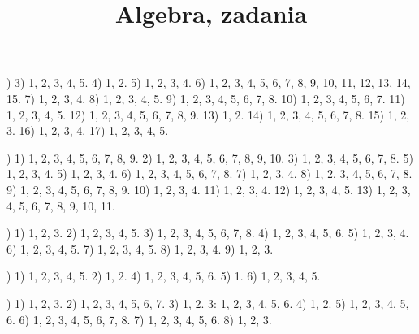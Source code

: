 \documentclass[a4paper,11pt]{article}
\title{Algebra, zadania}
\begin{document}





\maketitle %







\noindent
{}) 3) 1, 2, 3, 4, 5. 4) 1, 2. 5) 1, 2, 3, 4. 6) 1, 2, 3, 4,
5, 6, 7, 8, 9, 10, 11, 12, 13, 14, 15. 7) 1, 2, 3, 4.
8) 1, 2, 3, 4, 5. 9) 1, 2, 3, 4, 5, 6, 7, 8. 10) 1, 2, 3, 4, 5, 6, 7.
11) 1, 2, 3, 4, 5. 12) 1, 2, 3, 4, 5, 6, 7, 8, 9. 13) 1, 2. 14) 1, 2, 3,
4, 5, 6, 7, 8. 15) 1, 2, 3. 16) 1, 2, 3, 4. 17) 1, 2, 3, 4, 5.

\vspace{\spaceFour}



\noindent
{}) 1) 1, 2, 3, 4, 5, 6, 7, 8, 9. 2) 1, 2, 3, 4, 5, 6, 7,
8, 9, 10. 3) 1, 2, 3, 4, 5, 6, 7, 8. 5) 1, 2, 3, 4. 5) 1, 2, 3, 4.
6) 1, 2, 3, 4, 5, 6, 7, 8. 7) 1, 2, 3, 4. 8) 1, 2, 3, 4, 5, 6, 7, 8.
9) 1, 2, 3, 4, 5, 6, 7, 8, 9. 10) 1, 2, 3, 4. 11) 1, 2, 3, 4.
12) 1, 2, 3, 4, 5. 13) 1, 2, 3, 4, 5, 6, 7, 8, 9, 10, 11.

\vspace{\spaceFour}



\noindent
{}) 1) 1, 2, 3. 2) 1, 2, 3, 4, 5. 3) 1, 2, 3, 4, 5, 6, 7, 8.
4) 1, 2, 3, 4, 5, 6. 5) 1, 2, 3, 4. 6) 1, 2, 3, 4, 5. 7) 1, 2, 3, 4, 5.
8) 1, 2, 3, 4. 9) 1, 2, 3.

\vspace{\spaceFour}



\noindent
{}) 1) 1, 2, 3, 4, 5. 2) 1, 2. 4) 1, 2, 3, 4, 5, 6. 5) 1.
6) 1, 2, 3, 4, 5.

\vspace{\spaceFour}



\noindent
{}) 1) 1, 2, 3. 2) 1, 2, 3, 4, 5, 6, 7. 3) 1, 2. 3: 1, 2, 3,
4, 5, 6. 4) 1, 2. 5) 1, 2, 3, 4, 5, 6. 6) 1, 2, 3, 4, 5, 6, 7, 8.
7) 1, 2, 3, 4, 5, 6. 8) 1, 2, 3.
\end{document}
